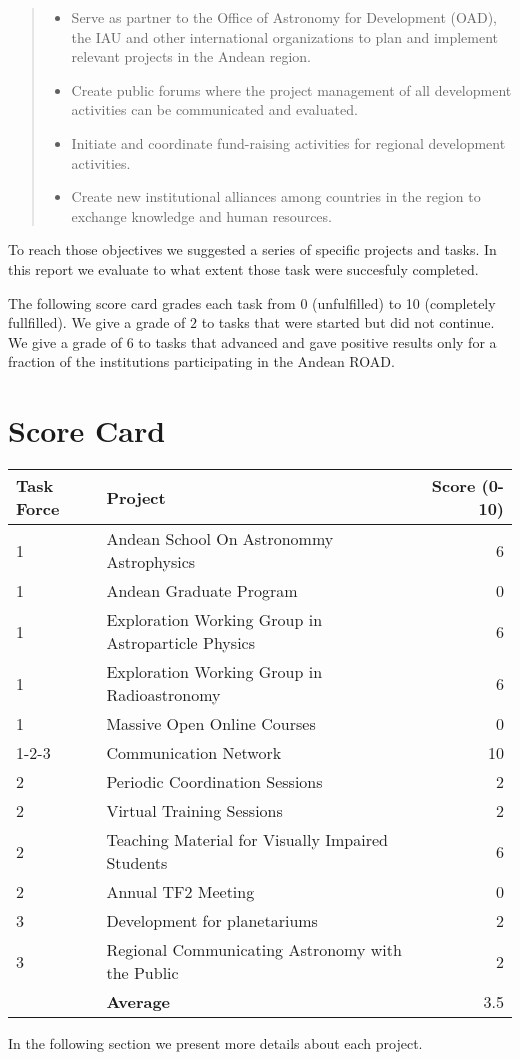 \begin{quote}
\begin{itemize}
\item Serve as partner to the Office of Astronomy for Development (OAD),
the IAU and other international organizations to plan and implement
relevant projects in the Andean region. 
\item Create public forums where the project management of all
development activities can be communicated and evaluated. 
\item Initiate and coordinate fund-raising activities for regional
development activities. 
\item Create new institutional alliances among countries in the region
to exchange knowledge and human resources. 

\end{itemize}

\end{quote} 

To reach those objectives we suggested a series of specific projects and tasks. 
In this report we evaluate to what extent those task were succesfuly
completed.

The following score card grades each task from 0 (unfulfilled) to 10
(completely fullfilled). We give a grade of $2$ to tasks that were
started but did not continue. We give a grade of $6$ to tasks that
advanced and gave positive results only for a fraction of the
institutions participating in the Andean ROAD.

\section{Score Card}

\begin{table}[!h]
\begin{center}
\begin{tabular}{lp{9cm}r}
Task Force & Project & Score (0-10)\\\hline
1 & Andean School On Astronommy Astrophysics & 6\\
1 & Andean Graduate Program & 0 \\
1 & Exploration Working Group in Astroparticle Physics & 6\\
1 & Exploration Working Group in Radioastronomy & 6\\
1 & Massive Open Online Courses & 0 \\ 
1-2-3 & Communication Network & 10\\
2  & Periodic Coordination Sessions & 2\\
2 & Virtual Training Sessions & 2\\
2 & Teaching Material for Visually Impaired Students & 6\\
2 & Annual TF2 Meeting & 0\\
3 & Development for planetariums & 2\\
3 & Regional Communicating Astronomy with the Public & 2\\\hline
 & \textbf{Average} & 3.5\\ 
\end{tabular}
\end{center}

In the following section we present more details about each project.
\end{table}


